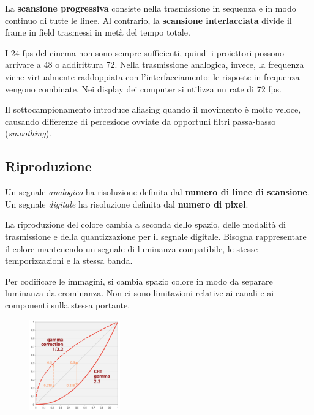 La \textbf{scansione progressiva} consiste nella trasmissione in sequenza e in modo continuo di tutte le linee. Al contrario, la \textbf{scansione interlacciata} divide il frame in field trasmessi in metà del tempo totale.

I 24 fps del cinema non sono sempre sufficienti, quindi i proiettori possono arrivare a 48 o addirittura 72. Nella trasmissione analogica, invece, la frequenza viene virtualmente raddoppiata con l'interfacciamento: le risposte in frequenza vengono combinate. Nei display dei computer si utilizza un rate di 72 fps.

Il sottocampionamento introduce aliasing quando il movimento è molto veloce, causando differenze di percezione ovviate da opportuni filtri passa-basso (\textit{smoothing}). 

\subsection{Riproduzione}
Un segnale \textit{analogico} ha risoluzione definita dal \textbf{numero di linee di scansione}. \\
Un segnale \textit{digitale} ha risoluzione definita dal \textbf{numero di pixel}.

La riproduzione del colore cambia a seconda dello spazio, delle modalità di trasmissione e della quantizzazione per il segnale digitale. Bisogna rappresentare il colore mantenendo un segnale di luminanza compatibile, le stesse temporizzazioni e la stessa banda.

Per codificare le immagini, si cambia spazio colore in modo da separare luminanza da crominanza. Non ci sono limitazioni relative ai canali e ai componenti sulla stessa portante. 

 \begin{figure}
	\vspace{-5pt}
	\includegraphics[width=0.35\textwidth]{Lezioni/Immagini/gamma}
	\vspace{-30pt}
\end{figure}

